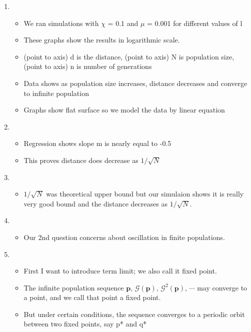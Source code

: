 \documentclass{article}
\begin{document}
\begin{enumerate}
\item
  \begin{itemize}
  \item We ran simulations with $\chi$ = 0.1 and $\mu$ = 0.001 for
    different values of l
  \item These graphs show the results in logarithmic scale.
  \item  (point to axis) d is the distance, (point to axis) N is population size, (point to axis) n is number of
    generations
  \item Data shows as population size increases, distance decreases and 
    converge to infinite population
  \item Graphs show flat surface so we model the data by linear equation  
  \end{itemize}
    
\item
  \begin{itemize}
  \item Regression shows slope m is nearly equal to -0.5
  \item This proves distance does decrease as $1/\sqrt{N}$  
  \end{itemize}

\item
  \begin{itemize}
  \item $1/\sqrt{N}$ was theoretical upper bound but our simulaion shows it is really very good bound and the distance decreases as $1/\sqrt{N}$. 
  \end{itemize}
    
\item 
  \begin{itemize}
  \item Our 2nd question concerns about oscillation in
    finite populations.
  \end{itemize}
    
\item
  \begin{itemize}
  \item First I want to introduce term limit; we also call it fixed
    point.
  \item The infinite population sequence  $\bm{p}, \, \mathcal{G}(\bm{p}), \, {\mathcal{G}}^2(\bm{p}), \, \cdots$ may
    converge to a point, and we call that point a fixed point.
  \item But under certain conditions, the sequence converges to a
    periodic orbit between two fixed points, say p* and q*
\end{itemize}


\end{enumerate}
\end{document}
